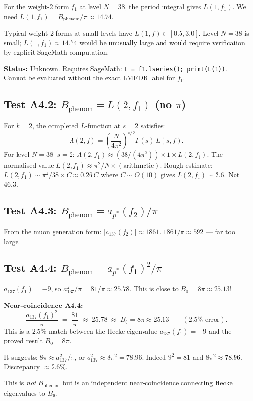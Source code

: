 \documentclass[12pt,a4paper]{article}
\theoremstyle{definition}
\theoremstyle{remark}
\begin{document}
For the weight-2 form $f_1$ at level $N = 38$, the period integral gives
$L(1, f_1)$.  We need $L(1, f_1) = B_{\mathrm{phenom}}/\pi \approx 14.74$.

Typical weight-2 forms at small levels have $L(1,f) \in [0.5, 3.0]$.
Level $N = 38$ is small; $L(1, f_1) \approx 14.74$ would be unusually
large and would require verification by explicit SageMath computation.

\begin{gapbox}
\textbf{Status:} Unknown.  Requires SageMath: \texttt{L = f1.lseries();
print(L(1))}.  Cannot be evaluated without the exact LMFDB label for $f_1$.
\end{gapbox}

\subsection{Test A4.2: $B_{\mathrm{phenom}} = L(2, f_1)$ (no $\pi$)}

For $k = 2$, the completed $L$-function at $s = 2$ satisfies:
\begin{equation}
  \Lambda(2, f) = \left(\frac{N}{4\pi^2}\right)^{s/2} \Gamma(s)\,L(s,f).
\end{equation}
For level $N = 38$, $s = 2$:
$\Lambda(2, f_1) \approx (38/(4\pi^2)) \times 1 \times L(2,f_1)$.
The normalised value $L(2, f_1) \approx \pi^2/N \times (\text{arithmetic})$.
Rough estimate: $L(2, f_1) \sim \pi^2/38 \times C \approx 0.26\,C$ where
$C \sim O(10)$ gives $L(2, f_1) \sim 2.6$.  Not 46.3.

\subsection{Test A4.3: $B_{\mathrm{phenom}} = a_{p^*}(f_2)/\pi$}

From the muon generation form: $|a_{137}(f_2)| \approx 1861$.
$1861/\pi \approx 592$ --- far too large.

\subsection{Test A4.4: $B_{\mathrm{phenom}} = a_{p^*}(f_1)^2/\pi$}

$a_{137}(f_1) = -9$, so $a_{137}^2/\pi = 81/\pi \approx 25.78$.
This is close to $B_0 = 8\pi \approx 25.13$!

\begin{resultbox}
\textbf{Near-coincidence A4.4:}
\[
  \frac{a_{137}(f_1)^2}{\pi} \;=\; \frac{81}{\pi} \;\approx\; 25.78
  \;\approx\; B_0 = 8\pi \approx 25.13 \qquad (2.5\%\text{ error}).
\]
This is a $2.5\%$ match between the Hecke eigenvalue $a_{137}(f_1) = -9$
and the proved result $B_0 = 8\pi$.

It suggests: $8\pi \approx a_{137}^2/\pi$, or $a_{137}^2 \approx 8\pi^2 = 78.96$.
Indeed $9^2 = 81$ and $8\pi^2 \approx 78.96$.  Discrepancy $\approx 2.6\%$.

This is \emph{not} $B_{\mathrm{phenom}}$ but is an independent near-coincidence
connecting Hecke eigenvalues to $B_0$.
\end{resultbox}
\end{document}
